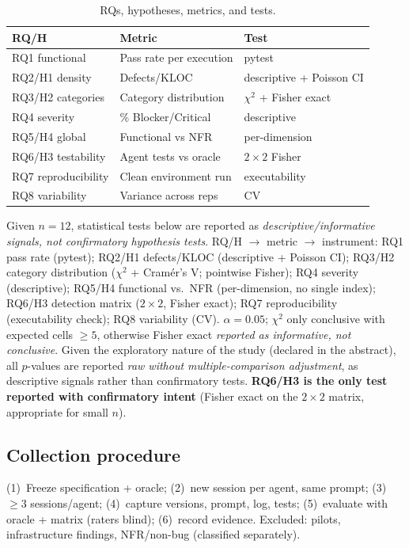 \documentclass[10pt,twocolumn]{article}
\begin{document}
\begin{table}[t]
\caption{RQs, hypotheses, metrics, and tests.}
\label{tab:rq}
\small
\begin{tabularx}{\columnwidth}{@{}l X X@{}}
\toprule
\textbf{RQ/H} & \textbf{Metric} & \textbf{Test}\\
\midrule
RQ1 functional & Pass rate per execution & pytest\\
RQ2/H1 density & Defects/KLOC & descriptive + Poisson CI\\
RQ3/H2 categories & Category distribution & $\chi^2$ + Fisher exact\\
RQ4 severity & \% Blocker/Critical & descriptive\\
RQ5/H4 global & Functional vs NFR & per-dimension\\
RQ6/H3 testability & Agent tests vs oracle & $2\times2$ Fisher\\
RQ7 reproducibility & Clean environment run & executability\\
RQ8 variability & Variance across reps & CV\\
\bottomrule
\end{tabularx}
\end{table}

Given $n=12$, statistical tests below are reported as \emph{descriptive/informative signals, not confirmatory hypothesis tests}. RQ/H $\rightarrow$ metric $\rightarrow$ instrument: RQ1 pass rate (pytest); RQ2/H1 defects/KLOC (descriptive + Poisson CI); RQ3/H2 category distribution ($\chi^2$ + Cram\'er's V; pointwise Fisher); RQ4 severity (descriptive); RQ5/H4 functional vs.\ NFR (per-dimension, no single index); RQ6/H3 detection matrix ($2\times2$, Fisher exact); RQ7 reproducibility (executability check); RQ8 variability (CV). $\alpha=0.05$; $\chi^2$ only conclusive with expected cells $\ge5$, otherwise Fisher exact \emph{reported as informative, not conclusive}. Given the exploratory nature of the study (declared in the abstract), all $p$-values are reported \emph{raw without multiple-comparison adjustment}, as descriptive signals rather than confirmatory tests. \textbf{RQ6/H3 is the only test reported with confirmatory intent} (Fisher exact on the $2\times2$ matrix, appropriate for small $n$).

\subsection{Collection procedure}

(1)~Freeze specification + oracle; (2)~new session per agent, same prompt; (3)~$\ge$3 sessions/agent; (4)~capture versions, prompt, log, tests; (5)~evaluate with oracle + matrix (raters blind); (6)~record evidence. Excluded: pilots, infrastructure findings, NFR/non-bug (classified separately).
\end{document}
